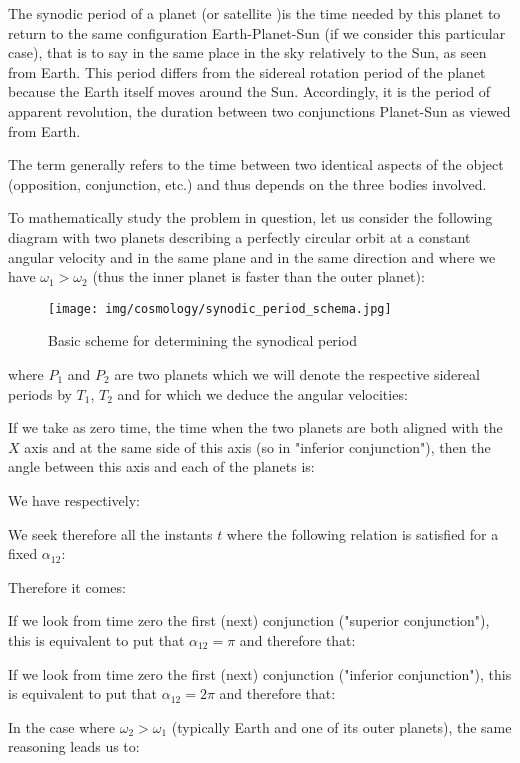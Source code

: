 	The synodic period of a planet (or satellite )is the time needed by this planet to return to the same configuration Earth-Planet-Sun (if we consider this particular case), that is to say in the same place in the sky relatively to the Sun, as seen from Earth. This period differs from the sidereal rotation period of the planet because the Earth itself moves around the Sun. Accordingly, it is the period of apparent revolution, the duration between two conjunctions Planet-Sun as viewed from Earth.

	The term generally refers to the time between two identical aspects of the object (opposition, conjunction, etc.) and thus depends on the three bodies involved.
	
	To mathematically study the problem in question, let us consider the following diagram with two planets describing a perfectly circular orbit at a constant angular velocity and in the same plane and in the same direction and where we have $\omega_1>\omega_2$ (thus the inner planet is faster than the outer planet):
	\begin{figure}[H]
		\centering
		\texttt{[image: img/cosmology/synodic\_period\_schema.jpg]}	
		\caption{Basic scheme for determining the synodical period}
	\end{figure}
	where $P_1$ and $P_2$ are two planets which we will denote the respective sidereal  periods by $T_1$, $T_2$ and for which we deduce the angular velocities:
	
	If we take as zero time, the time when the two planets are both aligned with the $X$ axis and at the same side of this axis (so in "inferior conjunction"), then the angle between this axis and each of the planets is:
	
	We have respectively:
	
	We seek therefore all the instants $t$ where the following relation is satisfied for a fixed $\alpha_{12}$:
	
	Therefore it comes:
	
	If we look from time zero the first (next) conjunction ("superior conjunction"), this is equivalent to put that $\alpha_{12}=\pi$ and therefore that:
	
	If we look from time zero the first (next) conjunction ("inferior conjunction"),  this is equivalent to put that $\alpha_{12}=2\pi$ and therefore that:
	
	In the case where $\omega_2>\omega_1$ (typically Earth and one of its outer planets), the same reasoning leads us to:
	

